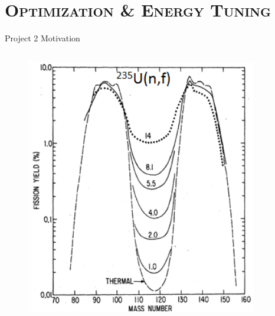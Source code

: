 \documentclass[xcolor=x11names,compress,handout]{beamer}
\renewcommand{\(}{\begin{columns}}
\renewcommand{\)}{\end{columns}}
\newcommand{\<}[1]{\begin{column}{#1}}
\renewcommand{\>}{\end{column}}
\begin{document}
\section{\scshape Optimization \& Energy Tuning}
\begin{frame}{Project 2 Motivation}
  \begin{columns}
    \begin{column}{0.55\linewidth}
      \vspace{-.5cm}
      \begin{figure}[htp]
        \includegraphics[width=0.9\textwidth]{../figs/FP_Distribution.png}
      \end{figure}
    \end{column}
    

\end{columns}
\end{frame}
\end{document}
